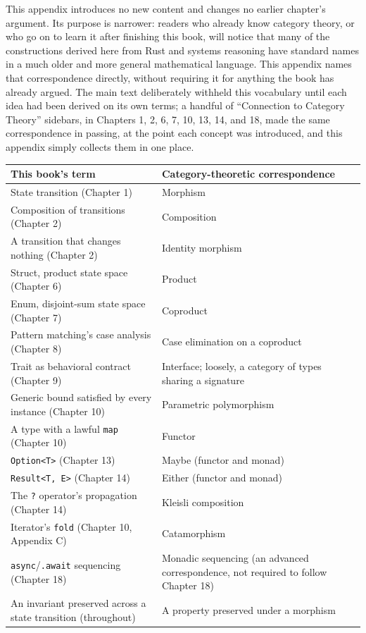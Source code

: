 \documentclass[11pt]{book}
\begin{document}
This appendix introduces no new content and changes no earlier chapter's argument. Its purpose is narrower: readers who already know category theory, or who go on to learn it after finishing this book, will notice that many of the constructions derived here from Rust and systems reasoning have standard names in a much older and more general mathematical language. This appendix names that correspondence directly, without requiring it for anything the book has already argued. The main text deliberately withheld this vocabulary until each idea had been derived on its own terms; a handful of ``Connection to Category Theory'' sidebars, in Chapters 1, 2, 6, 7, 10, 13, 14, and 18, made the same correspondence in passing, at the point each concept was introduced, and this appendix simply collects them in one place.

\begin{center}
\begin{tabular}{p{6.3cm}p{6.3cm}}
\toprule
\textbf{This book's term} & \textbf{Category-theoretic correspondence} \\
\midrule
State transition (Chapter 1) & Morphism \\
Composition of transitions (Chapter 2) & Composition \\
A transition that changes nothing (Chapter 2) & Identity morphism \\
Struct, product state space (Chapter 6) & Product \\
Enum, disjoint-sum state space (Chapter 7) & Coproduct \\
Pattern matching's case analysis (Chapter 8) & Case elimination on a coproduct \\
Trait as behavioral contract (Chapter 9) & Interface; loosely, a category of types sharing a signature \\
Generic bound satisfied by every instance (Chapter 10) & Parametric polymorphism \\
A type with a lawful \texttt{map} (Chapter 10) & Functor \\
\texttt{Option<T>} (Chapter 13) & Maybe (functor and monad) \\
\texttt{Result<T, E>} (Chapter 14) & Either (functor and monad) \\
The \texttt{?} operator's propagation (Chapter 14) & Kleisli composition \\
Iterator's \texttt{fold} (Chapter 10, Appendix C) & Catamorphism \\
\texttt{async}/\texttt{.await} sequencing (Chapter 18) & Monadic sequencing (an advanced correspondence, not required to follow Chapter 18) \\
An invariant preserved across a state transition (throughout) & A property preserved under a morphism \\
\bottomrule
\end{tabular}
\end{center}
\end{document}
